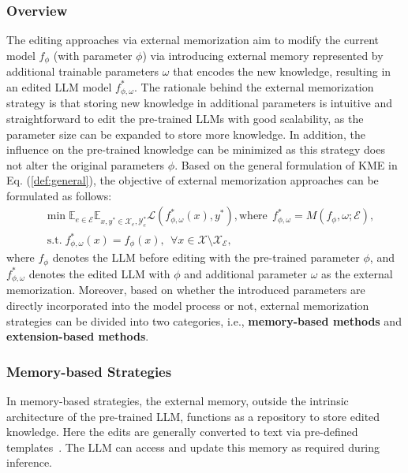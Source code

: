 \documentclass[acmsmall, screen]{acmart}
\def \st{\;\text{s.t.}\;}
\begin{document}
\subsubsection{\textbf{Overview}} The editing approaches via external memorization aim to modify the current model $f_\phi$ (with parameter $\phi$) via introducing external memory represented by additional trainable parameters $\omega$ that encodes the new knowledge, resulting in an edited LLM model $f^*_{\phi, \omega}$. The rationale behind the external memorization strategy is that storing new knowledge in additional parameters is intuitive and straightforward to edit the pre-trained LLMs with good scalability, as the parameter size can be expanded to store more knowledge. In addition, the influence on the pre-trained knowledge can be minimized as this strategy does not alter the original parameters $\phi$. Based on the general formulation of KME in Eq. (\ref{def:general}), the objective of external memorization approaches can be formulated as follows:
    \begin{equation} \label{eq:formulation}
    \begin{aligned}
            & \min \mathbb{E}_{e \in \mathcal{E}} \mathbb{E}_{x, y^{*} \in \mathcal{X}_e, \mathcal{Y}^*_e} \mathcal{L} (f^*_{\phi, \omega}(x), y^{*}), \text{where}\ \  f^*_{\phi, \omega}=M(f_\phi, \omega; \mathcal{E}),\\
        &\st f^*_{\phi, \omega}(x)=f_\phi(x),\ \  \forall x\in \mathcal{X}\setminus \mathcal{X}_\mathcal{E},
    \end{aligned}
    \end{equation}
 where $f_\phi$ denotes the LLM before editing with the pre-trained  parameter $\phi$, and $f^*_{\phi, \omega}$ denotes the edited LLM with $\phi$ and additional parameter $\omega$ as the external memorization. Moreover, based on whether the introduced parameters are directly incorporated into the model process or not, external memorization strategies can be divided into two categories, i.e., \textbf{memory-based methods} and \textbf{extension-based methods}.


\subsubsection{\textbf{Memory-based Strategies}}
In memory-based strategies, the external memory, outside the intrinsic architecture of the pre-trained LLM, functions as a repository to store edited knowledge. {Here the edits are generally converted to text via pre-defined templates~\cite{MQuAKE, IKE,p2}.} The LLM can access and update this memory as required during inference. 
\end{document}
